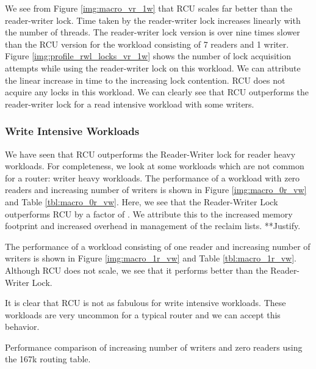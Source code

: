 \documentclass[a4paper,marginparwidth=50pt,marginparsep=10pt]{article}
\begin{document}
We see from Figure \ref{img:macro_vr_1w} that RCU scales far better
than the reader-writer lock. Time taken by the reader-writer lock
increases linearly with the number of threads. The reader-writer lock
version is over nine times slower than the RCU version for the
workload consisting of 7 readers and 1 writer. Figure \ref{img:profile_rwl_locks_vr_1w} shows the number of lock acquisition attempts while using the reader-writer lock on this workload. We can attribute the linear increase in time to the increasing lock contention. RCU does not acquire any locks in this workload. We can clearly see that RCU
outperforms the reader-writer lock for a read intensive workload with some writers.

\subsubsection{Write Intensive Workloads}
We have seen that RCU outperforms the Reader-Writer lock for reader heavy workloads. For completeness, we look at some workloads which are not common for a router: writer heavy workloads. The performance of a workload with zero readers and increasing number of writers is shown in  Figure \ref{img:macro_0r_vw} and Table \ref{tbl:macro_0r_vw}. Here, we see that the Reader-Writer Lock outperforms RCU by a factor of . We attribute this to the increased memory footprint and increased overhead in management of the reclaim lists. **Justify.

The performance of a workload consisting of one reader and increasing number of writers is shown in  Figure \ref{img:macro_1r_vw} and Table \ref{tbl:macro_1r_vw}. Although RCU does not scale, we see that it performs better than the Reader-Writer Lock.

It is clear that RCU is not as fabulous for write intensive workloads. These workloads are very uncommon for a typical router and we can accept this behavior.
 
\begin{table}[tph]
\begin{center}

\end{center}
\caption{Performance comparison of increasing number of writers and zero readers using the 167k routing table.}
\label{tbl:macro_0r_vw}
\end{table}
\end{document}
